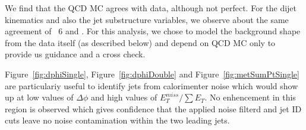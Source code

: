 \newpage


We find that the QCD MC agrees with data, although not perfect.
For the dijet kinematics and also the jet substructure variables, we observe about the same agreement of \PYTHIA~6 and \HERWIG{++}. 
For this analysis, we chose to model the background shape from the data itself
(as described below)
and depend on QCD MC only to provide us guidance and a cross check.

Figure~\ref{fig:dphiSingle}, Figure~\ref{fig:dphiDouble} and Figure~\ref{fig:metSumPtSingle} are particulariy useful to identify jets from calorimenter noise which would show up at low values of $\Delta\phi$ and high values of $E_{T}^{miss}/\sum E_{T}$. No enhencement in this region is observed which gives confidence that the applied noise filterd and jet ID cuts leave no noise contamination within the two leading jets.




